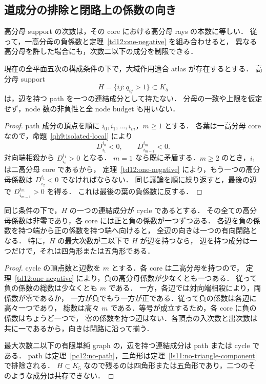 \subsection{道成分の排除と閉路上の係数の向き}
\label{pc12:section}

高分母 support の次数は，その core における高分母 rays の本数に等しい．
従って，一高分母の負係数と定理~\ref{td12:one-negative} を組み合わせると，
異なる高分母を許した場合にも，次数二以下の成分を制限できる．

\begin{theorem}[高分母の道成分の不存在]\label{pc12:no-path}
現在の全平面五次の構成条件の下で，大域作用適合 atlas が存在するとする．
高分母 support
\[
 H=\{ij:q_{ij}>1\}\subset K_5
\]
は，辺を持つ path を一つの連結成分として持たない．
分母の一致や上限を仮定せず，node 数の非負性と全 node budget も用いない．
\end{theorem}

\begin{proof}
path 成分の頂点を順に $i_0,i_1,\ldots,i_m$，$m\geq1$ とする．
各葉は一高分母 core なので，命題~\ref{qh9:isolated-local} により
\[
 D^{i_0}_{i_1}<0,\qquad D^{i_m}_{i_{m-1}}<0.
\]
対向端相殺から $D^{i_1}_{i_0}>0$ となる．
$m=1$ なら既に矛盾する．$m\geq2$ のとき，$i_1$ は二高分母 core であるから，
定理~\ref{td12:one-negative} により，もう一つの高分母係数は
$D^{i_1}_{i_2}<0$ でなければならない．
同じ議論を順に繰り返すと，最後の辺で $D^{i_m}_{i_{m-1}}>0$ を得る．
これは最後の葉の負係数に反する．
\end{proof}

\begin{proposition}[閉路に沿う非零係数]\label{pc12:cycle-orientation}
同じ条件の下で，$H$ の一つの連結成分が cycle であるとする．
その全ての高分母係数は非零であり，各 core には正と負の係数が一つずつある．
各辺を負の係数を持つ端から正の係数を持つ端へ向けると，
全辺の向きは一つの有向閉路となる．
特に，$H$ の最大次数が二以下で $H$ が辺を持つなら，
辺を持つ成分は一つだけで，それは四角形または五角形である．
\end{proposition}

\begin{proof}
cycle の頂点数と辺数を $m$ とする．各 core は二高分母を持つので，
定理~\ref{td12:one-negative} により，負の高分母係数が少なくとも一つある．
従って負の係数の総数は少なくとも $m$ である．
一方，各辺では対向端相殺により，両係数が零であるか，
一方が負でもう一方が正である．従って負の係数は各辺に高々一つであり，
総数は高々 $m$ である．等号が成立するため，各 core に負の係数はちょうど一つで，
零の係数を持つ辺はない．各頂点の入次数と出次数は共に一であるから，向きは閉路に沿って揃う．

最大次数二以下の有限単純 graph の，辺を持つ連結成分は path または cycle である．
path は定理~\ref{pc12:no-path}，三角形は定理~\ref{ls11:no-triangle-component} で排除される．
$H\subset K_5$ なので残るのは四角形または五角形であり，二つのそのような成分は共存できない．
\end{proof}

